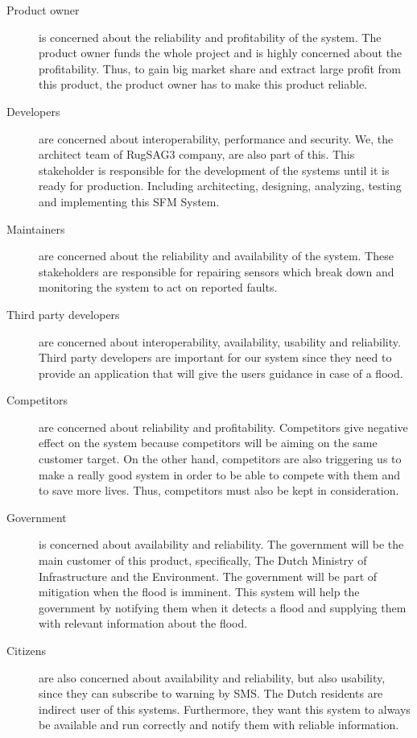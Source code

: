 \begin{description}
	\item[Product owner] is concerned about the reliability and profitability of the system. The product owner funds the whole project and is highly concerned about the profitability. Thus, to gain big market share and extract large profit from this product, the product owner has to make this product reliable.
			 
	\item[Developers] are concerned about interoperability, performance and security. We, the architect team of RugSAG3 company, are also part of this. This stakeholder is responsible for the development of the systems until it is ready for production. Including architecting, designing, analyzing, testing and implementing this SFM System.
	
	\item[Maintainers] are concerned about the reliability and availability of the system. These stakeholders are responsible for repairing sensors which break down and monitoring the system to act on reported faults.
			
	\item[Third party developers] are concerned about interoperability, availability, usability and reliability. Third party developers are important for our system since they need to provide an application that will give the users guidance in case of a flood.
			
	\item[Competitors] are concerned about reliability and profitability. Competitors give negative effect on the system because competitors will be aiming on the same customer target. On the other hand, competitors are also triggering us to make a really good system in order to be able to compete with them and to save more lives. Thus, competitors must also be kept in consideration.
			
	\item[Government] is concerned about availability and reliability. The government will be the main customer of this product, specifically, The Dutch Ministry of Infrastructure and the Environment. The government will be part of mitigation when the flood is imminent. This system will help the government by notifying them when it detects a flood and supplying them with relevant information about the flood.
			
	\item[Citizens] are also concerned about availability and reliability, but also usability, since they can subscribe to warning by SMS. The Dutch residents are indirect user of this systems. Furthermore, they want this system to always be available and run correctly and notify them with reliable information.
			

\end{description}
